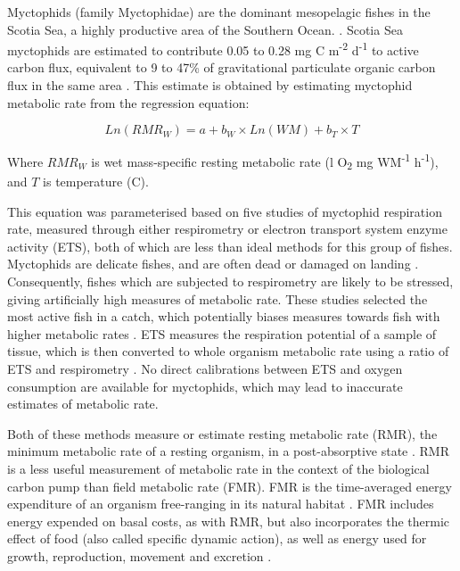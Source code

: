\documentclass[12pt, titlepage]{article}
\begin{document}
Myctophids (family Myctophidae) are the dominant mesopelagic fishes in the Scotia Sea, a highly productive area of the Southern Ocean. \citep{Catul2011, Collins2012}.
Scotia Sea myctophids are estimated to contribute 0.05 to 0.28 mg C m\textsuperscript{-2} d\textsuperscript{-1} to active carbon flux, equivalent to 9 to 47\% of gravitational particulate organic carbon flux in the same area \citep{Belcher2019}.
This estimate is obtained by estimating myctophid metabolic rate from the regression equation:

\begin{equation}
\label{equ:RMR}
Ln(RMR_{W}) = a + b_{W} \times Ln(WM) + b_{T} \times T
\end{equation}

\noindent Where $RMR_{W}$ is wet mass-specific resting metabolic rate (\textmu l O\textsubscript{2} mg WM\textsuperscript{-1} h\textsuperscript{-1}), and $T$ is temperature (\textdegree C).

This equation was parameterised based on five studies of myctophid respiration rate, \citep{Ariza2015, Donnelly1988, Ikeda1989, Torres1979, Torres1988a}
 measured through either respirometry or electron transport system enzyme activity (ETS), both of which are less than ideal methods for this group of fishes.
Myctophids are delicate fishes, and are often dead or damaged on landing \citep{Catul2011}.
Consequently, fishes which are subjected to respirometry are likely to be stressed, giving artificially high measures of metabolic rate.
These studies selected the most active fish in a catch, which potentially biases measures towards fish with higher metabolic rates \citep{Torres1988a}.
ETS measures the respiration potential of a sample of tissue, which is then converted to whole organism metabolic rate using a ratio of ETS and respirometry \citep{Ariza2015, Cammen1990, Ikeda1989}.
No direct calibrations between ETS and oxygen consumption are available for myctophids, which may lead to inaccurate estimates of metabolic rate.

Both of these methods measure or estimate resting metabolic rate (RMR), the minimum metabolic rate of a resting organism, in a post-absorptive state \citep{Treberg2016}.
RMR is a less useful measurement of metabolic rate in the context of the biological carbon pump than field metabolic rate (FMR).
FMR is the time-averaged energy expenditure of an organism free-ranging in its natural habitat \citep{Treberg2016}.
FMR includes energy expended on basal costs, as with RMR, but also incorporates the thermic effect of food (also called specific dynamic action), as well as energy used for growth, reproduction, movement and excretion \citep{Chung2019a, Chung2019b, Treberg2016}.
\end{document}
